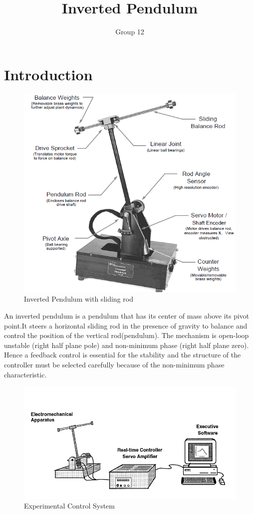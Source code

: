 \documentclass[12pt, a4paper]{article}
\title{\textbf{Inverted Pendulum}}
\author{Group 12}
\begin{document}
\maketitle
\newpage
\tableofcontents
\newpage
\section{Introduction}
\begin{figure}[H]
\centering
\includegraphics[width = \textwidth]{pendulumfoto.png}
\caption{Inverted Pendulum with sliding rod}
\label{Fig1}
\end{figure}
An inverted pendulum is a pendulum that has its center of mass above its pivot point.It steers a horizontal sliding rod in the presence of gravity to balance and control the position of the vertical rod(pendulum). The mechanism is open-loop unstable (right half plane pole) and non-minimum phase (right half plane zero). Hence a feedback control is essential for the stability and the structure of the controller must be selected carefully because of the non-minimum phase characteristic.
\begin{figure}[H]
\centering
\includegraphics[width = \textwidth]{system.png}
\caption{Experimental Control System}
\label{Fig2}
\end{figure}
\end{document}
